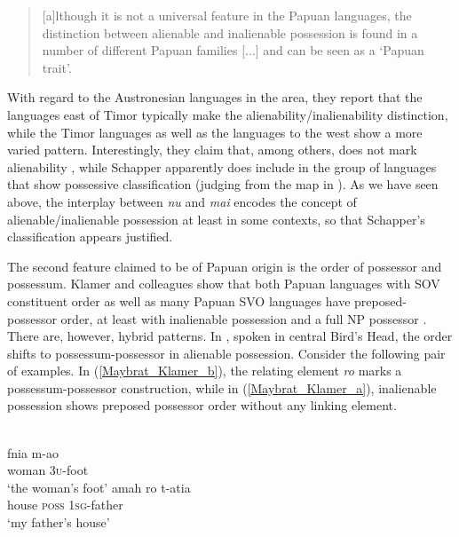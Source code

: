 \begin{quote}[a]lthough it is not a universal feature in the Papuan languages,
the distinction between alienable and inalienable possession is found in a number of different Papuan families [...] and can be seen as a `Papuan trait’.\end{quote}

With regard to the Austronesian languages in the area, they report that the languages east of Timor typically make the alienability/inalienability distinction, while the Timor languages as well as the languages to the west show a more varied pattern. Interestingly, they claim that, among others,  does not mark alienability \citep[120]{klamer2008east}, while Schapper apparently does include  in the group of languages that show possessive classification (judging from the map in \citealt[110]{schapper2009bunaq}). As we have seen above, the interplay between \textit{nu} and \textit{mai} encodes the concept of alienable/inalienable possession at least in some contexts, so that Schapper's classification appears justified.

The second feature claimed to be of Papuan origin is the order of possessor and possessum. Klamer and colleagues show that both Papuan languages with SOV constituent order as well as many Papuan SVO languages have preposed-possessor order, at least with inalienable possession and a full NP possessor \citep[123f.]{klamer2008east}. There are, however, hybrid patterns. In , spoken in central Bird's Head, the order shifts to possessum-possessor in alienable possession. Consider the following pair of examples. In (\ref{Maybrat_Klamer_b}), the relating element \textit{ro} marks a possessum-possessor construction, while in (\ref{Maybrat_Klamer_a}), inalienable possession shows preposed possessor order without any linking element.

\ea
{}\\
\ea \label{Maybrat_Klamer_a}
\gll fnia m-ao\\
woman \textsc{3}\textsc{u}-foot\\
\glt ‘the woman's foot’
\ex \label{Maybrat_Klamer_b}
\gll amah ro t-atia\\
house \textsc{poss} \textsc{1}\textsc{sg}-father\\
\glt ‘my father's house’
\z
\z

